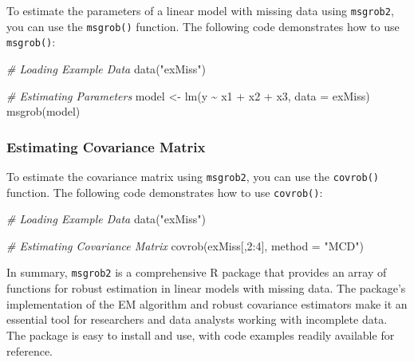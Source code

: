 \documentclass[
]{book}
\newenvironment{Shaded}{\begin{snugshade}}{\end{snugshade}}
\newcommand{\AttributeTok}[1]{\textcolor[rgb]{0.77,0.63,0.00}{#1}}
\newcommand{\CommentTok}[1]{\textcolor[rgb]{0.56,0.35,0.01}{\textit{#1}}}
\newcommand{\DecValTok}[1]{\textcolor[rgb]{0.00,0.00,0.81}{#1}}
\newcommand{\FunctionTok}[1]{\textcolor[rgb]{0.00,0.00,0.00}{#1}}
\newcommand{\NormalTok}[1]{#1}
\newcommand{\OtherTok}[1]{\textcolor[rgb]{0.56,0.35,0.01}{#1}}
\newcommand{\SpecialCharTok}[1]{\textcolor[rgb]{0.00,0.00,0.00}{#1}}
\newcommand{\StringTok}[1]{\textcolor[rgb]{0.31,0.60,0.02}{#1}}
\begin{document}
To estimate the parameters of a linear model with missing data using \texttt{msgrob2}, you can use the \texttt{msgrob()} function. The following code demonstrates how to use \texttt{msgrob()}:

\begin{Shaded}
\begin{Highlighting}[]
\CommentTok{\# Loading Example Data}
\FunctionTok{data}\NormalTok{(}\StringTok{"exMiss"}\NormalTok{)}

\CommentTok{\# Estimating Parameters}
\NormalTok{model }\OtherTok{\textless{}{-}} \FunctionTok{lm}\NormalTok{(y }\SpecialCharTok{\textasciitilde{}}\NormalTok{ x1 }\SpecialCharTok{+}\NormalTok{ x2 }\SpecialCharTok{+}\NormalTok{ x3, }\AttributeTok{data =}\NormalTok{ exMiss)}
\FunctionTok{msgrob}\NormalTok{(model)}
\end{Highlighting}
\end{Shaded}

\hypertarget{estimating-covariance-matrix}{%
\subsubsection*{Estimating Covariance Matrix}\label{estimating-covariance-matrix}}

To estimate the covariance matrix using \texttt{msgrob2}, you can use the \texttt{covrob()} function. The following code demonstrates how to use \texttt{covrob()}:

\begin{Shaded}
\begin{Highlighting}[]
\CommentTok{\# Loading Example Data}
\FunctionTok{data}\NormalTok{(}\StringTok{"exMiss"}\NormalTok{)}

\CommentTok{\# Estimating Covariance Matrix}
\FunctionTok{covrob}\NormalTok{(exMiss[,}\DecValTok{2}\SpecialCharTok{:}\DecValTok{4}\NormalTok{], }\AttributeTok{method =} \StringTok{"MCD"}\NormalTok{)}
\end{Highlighting}
\end{Shaded}

In summary, \texttt{msgrob2} is a comprehensive R package that provides an array of functions for robust estimation in linear models with missing data. The package's implementation of the EM algorithm and robust covariance estimators make it an essential tool for researchers and data analysts working with incomplete data. The package is easy to install and use, with code examples readily available for reference.
\end{document}
